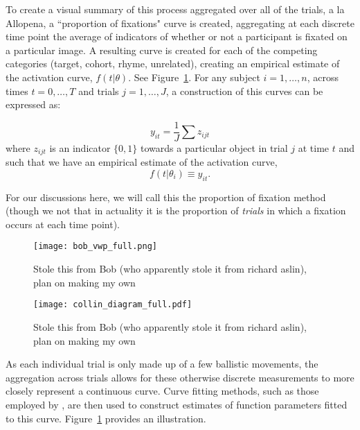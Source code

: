 To create a visual summary of this process aggregated over all of the trials, a la Allopena, a ``proportion of fixations" curve is created, aggregating at each discrete time point the average of indicators of whether or not a participant is fixated on a particular image. A resulting curve is created for each of the competing categories (target, cohort, rhyme, unrelated), creating an empirical estimate of the activation curve, $f(t|\theta)$. See Figure~\ref{fig:bob_diagram_full}. For any subject $i = 1, \dots, n$, across times $t = 0, \dots, T$ and trials $j = 1, \dots, J$, a construction  of this curves can be expressed as:


\begin{equation}\label{eq:sum_proportions}
y_{it} = \frac1J \sum z_{ijt}
\end{equation}
where $z_{ijt}$ is an indicator $\{0, 1\}$  towards a particular object in trial $j$ at time $t$ and such that we have an empirical estimate of the activation curve,
\begin{equation}\label{eq:empir_to_activation}
f(t | \theta_i) \equiv y_{it}.
\end{equation}



For our discussions here, we will call this the proportion of fixation method (though we not that in actuality it is the proportion of \textit{trials} in which a fixation occurs at each time point).


\begin{figure}[H]
\centering
\texttt{[image: bob\_vwp\_full.png]}
\caption{Stole this from Bob (who apparently stole it from richard aslin), plan on making my own}
\label{fig:bob_diagram_full}
\end{figure}

\begin{figure}[H]
\centering
\texttt{[image: collin\_diagram\_full.pdf]}
\caption{Stole this from Bob (who apparently stole it from richard aslin), plan on making my own}
\label{fig:collin_diagram_full}
\end{figure}



As each individual trial is only made up of a few ballistic movements, the aggregation across trials allows for these otherwise discrete measurements to more closely represent a continuous curve. Curve fitting methods, such as those employed by , are then used to construct estimates of function parameters fitted to this curve. Figure~\ref{fig:bob_diagram_full} provides an illustration.


